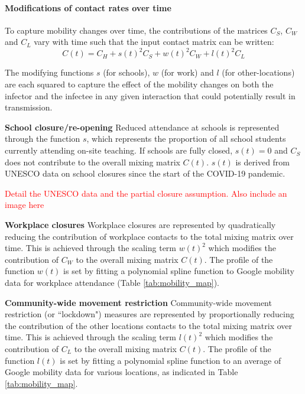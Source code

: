 \paragraph[blabla]{Modifications of contact rates over time}
To capture mobility changes over time, the contributions of the matrices \(C_{S}\), \(C_{W}\) and \(C_{L}\) vary with time such that the input contact matrix can be written:
\[C(t)= C_{H}+ s(t)^{2}C_{S}+ w(t)^{2}C_{W}+l(t)^{2}C_{L}\]

The modifying functions $s$ (for schools), $w$ (for work) and $l$ (for other-locations) are each squared to capture the effect of the mobility changes on 
both the infector and the infectee in any given interaction that could potentially result in transmission. 

\textbf{School closure/re-opening }
Reduced attendance at schools is represented through the function $s$, which represents the proportion of all school students 
currently attending on-site teaching. If schools are fully closed, \(s(t)=0\) and \(C_{S}\) does not contribute to the overall 
mixing matrix \(C(t)\). 
\(s(t)\) is derived from UNESCO data on school closures since the start of the COVID-19 pandemic. 

\textcolor{red}{Detail the UNESCO data and the partial closure assumption. Also include an image here}




\textbf{Workplace closures}
Workplace closures are represented by quadratically reducing the contribution of workplace contacts to the total mixing matrix over time. This is achieved through the scaling term \(w(t)^{2}\) which modifies the contribution of \(C_{W}\) to the overall mixing matrix \(C(t)\). The profile of the function \(w(t)\) is set by fitting a polynomial spline function to Google mobility data for workplace attendance (Table \ref{tab:mobility_map}).

\textbf{Community-wide movement restriction}
Community-wide movement restriction (or ``lockdown") measures are represented by proportionally reducing the contribution of the other locations contacts to the total mixing matrix over time. This is achieved through the scaling term \(l(t)^{2}\) which modifies the contribution of \(C_{L}\) to the overall mixing matrix \(C(t)\). The profile of the function \(l(t)\) is set by fitting a polynomial spline function to an average of Google mobility data for various locations, as indicated in Table \ref{tab:mobility_map}.

